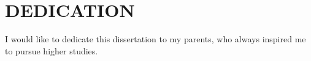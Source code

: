 \chapter*{DEDICATION}

I would like to dedicate this dissertation to my parents, who always inspired me to pursue higher studies.
